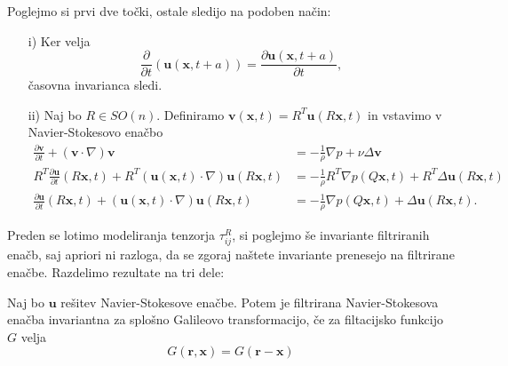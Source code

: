 \documentclass[mat2, tisk]{fmfdelo}
\newcommand{\bd}{\textbf}
\begin{document}
\begin{dokaz}
Poglejmo si prvi dve točki, ostale sledijo na podoben način:
\begin{enumerate}
  \item[i)] Ker velja $$\frac{\partial}{\partial t} (\bd{u}(\bd{x}, t + a)) = \frac{\partial \bd{u}(\bd{x}, t + a)}{\partial t},$$ časovna invarianca sledi.
  \item[ii)] Naj bo $R\in SO(n)$. Definiramo $\bd{v}(\bd{x}, t) = R^T \bd{u}(R\bd{x}, t)$ in vstavimo v 
  Navier-Stokesovo enačbo 
  \begin{align*}
  \frac{\partial \bd{v}}{\partial t} + (\bd{v}\cdot \nabla)\bd{v} &= -\frac{1}{\rho} \nabla p + \nu \Delta \bd{v} \\
  R^T \frac{\partial \bd{u}}{\partial t}(R\bd{x}, t) + R^T (\bd{u}(\bd{x}, t)\cdot \nabla)\bd{u}(R\bd{x}, t) &= -\frac{1}{\rho} R^T \nabla p(Q\bd{x}, t) + R^T \Delta \bd{u}(R\bd{x}, t) \\
  \frac{\partial \bd{u}}{\partial t}(R\bd{x}, t) + (\bd{u}(\bd{x}, t)\cdot \nabla)\bd{u}(R\bd{x}, t) &= -\frac{1}{\rho} \nabla p(Q\bd{x}, t) + \Delta \bd{u}(R\bd{x}, t).
  \end{align*}
\end{enumerate}
\end{dokaz}

Preden se lotimo modeliranja tenzorja $\tau_{ij}^R$, si poglejmo še invariante filtriranih enačb, 
saj apriori ni razloga, da se zgoraj naštete invariante prenesejo na filtrirane enačbe. 
Razdelimo rezultate na tri dele:
\begin{lema}
Naj bo $\bd{u}$ rešitev Navier-Stokesove enačbe. Potem je filtrirana Navier-Stokesova enačba 
invariantna za splošno Galileovo transformacijo, če za filtacijsko funkcijo $G$ velja 
$$
G(\bd{r}, \bd{x}) = G(\bd{r} - \bd{x})
$$
\end{lema}
\end{document}
